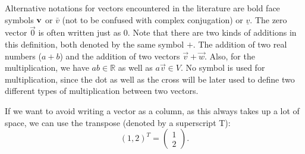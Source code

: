 \documentclass[
  a4paper,
  DIV=11,
  numbers=noendperiod,
  oneside]{scrreprt}
\theoremstyle{definition}
\theoremstyle{remark}
\begin{document}
\begin{tcolorbox}[enhanced jigsaw, colframe=quarto-callout-note-color-frame, breakable, colbacktitle=quarto-callout-note-color!10!white, colback=white, left=2mm, opacityback=0, opacitybacktitle=0.6, coltitle=black, toptitle=1mm, bottomrule=.15mm, leftrule=.75mm, title=\textcolor{quarto-callout-note-color}{\faInfo}\hspace{0.5em}{Remark on Notation}, arc=.35mm, rightrule=.15mm, toprule=.15mm, titlerule=0mm, bottomtitle=1mm]

Alternative notations for vectors encountered in the literature are bold
face symbols \({\bf v}\) or \(\bar v\) (not to be confused with complex
conjugation) or \(\underline v\). The zero vector \(\vec{0}\) is often
written just as \(0\). Note that there are two kinds of additions in
this definition, both denoted by the same symbol \(+\). The addition of
two real numbers (\(a+b\)) and the addition of two vectors
\(\vec{v}+\vec{w}\). Also, for the multiplication, we have
\(ab \in \mathbb{R}\) as well as \(a \vec{v} \in V\). No symbol is used
for multiplication, since the dot as well as the cross will be later
used to define two different types of multiplication between two
vectors.

If we want to avoid writing a vector as a column, as this always takes
up a lot of space, we can use the transpose (denoted by a superscript
T): \[ (1,2)^T = \begin{pmatrix}  1 \\ 2 \end{pmatrix}. \]

\end{tcolorbox}
\end{document}
